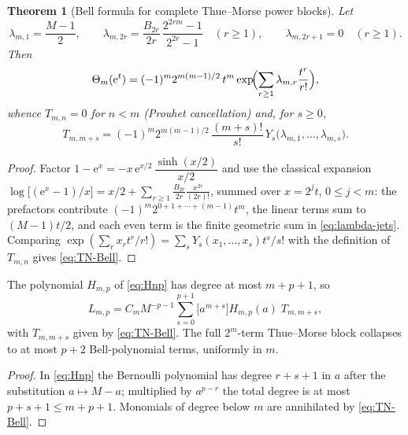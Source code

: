 \documentclass[11pt,oneside]{article}
\numberwithin{equation}{section}
\newtheorem{theorem}{Theorem}[section]
\theoremstyle{definition}
\theoremstyle{remark}
\newcommand{\e}{\mathrm e}
\newcommand{\Bell}{Y}
\newcommand{\ThetaTM}{\Theta}
\begin{document}
\begin{theorem}[Bell formula for complete Thue--Morse power blocks]
\label{thm:Bell-Prouhet}
Let
\begin{equation}
 \lambda_{m,1}=\frac{M-1}{2},
 \qquad
 \lambda_{m,2r}=\frac{B_{2r}}{2r}\,
 \frac{2^{2rm}-1}{2^{2r}-1}
 \quad(r\ge1),
 \qquad
 \lambda_{m,2r+1}=0\quad(r\ge1).
 \label{eq:lambda-jets}
\end{equation}
Then
\begin{equation}
 \ThetaTM_m(\e^{t})
 =(-1)^{m}2^{m(m-1)/2}\,t^{m}
 \exp\!\Bigl(\sum_{r\ge1}\lambda_{m,r}\frac{t^{r}}{r!}\Bigr),
 \label{eq:theta-Bell-egf}
\end{equation}
whence $T_{m,n}=0$ for $n<m$ (Prouhet cancellation) and, for
$s\ge0$,
\begin{equation}
 \boxed{\;
 T_{m,m+s}=(-1)^{m}2^{m(m-1)/2}\,
 \frac{(m+s)!}{s!}\,
 \Bell_s\bigl(\lambda_{m,1},\dots,\lambda_{m,s}\bigr).
 \;}
 \label{eq:TN-Bell}
\end{equation}
\end{theorem}

\begin{proof}
Factor $1-\e^{x}=-x\,\e^{x/2}\,\dfrac{\sinh(x/2)}{x/2}$ and use the
classical expansion
$\log\bigl[(\e^{x}-1)/x\bigr]
=x/2+\sum_{r\ge1}\frac{B_{2r}}{2r}\frac{x^{2r}}{(2r)!}$,
summed over $x=2^{j}t$, $0\le j<m$: the prefactors contribute
$(-1)^{m}2^{0+1+\cdots+(m-1)}t^{m}$, the linear terms sum to
$(M-1)t/2$, and each even term is the finite geometric sum in
\eqref{eq:lambda-jets}.  Comparing
$\exp(\sum_r x_rt^r/r!)=\sum_s\Bell_s(x_1,\dots,x_s)t^{s}/s!$ with the
definition of $T_{m,n}$ gives \eqref{eq:TN-Bell}.
\end{proof}

\begin{corollary}
\label{cor:pplus2}
The polynomial $H_{m,p}$ of \eqref{eq:Hnp} has degree at most
$m+p+1$, so
\begin{equation}
 \boxed{\;
 L_{m,p}=C_mM^{-p-1}
 \sum_{s=0}^{p+1}\bigl[a^{m+s}\bigr]H_{m,p}(a)\;T_{m,m+s},
 \;}
 \label{eq:Bell-collapse}
\end{equation}
with $T_{m,m+s}$ given by \eqref{eq:TN-Bell}.  The full
$2^{m}$-term Thue--Morse block collapses to at most $p+2$
Bell-polynomial terms, uniformly in $m$.
\end{corollary}

\begin{proof}
In \eqref{eq:Hnp} the Bernoulli polynomial has degree $r+s+1$ in $a$
after the substitution $a\mapsto M-a$; multiplied by $a^{p-r}$ the
total degree is at most $p+s+1\le m+p+1$.  Monomials of degree below
$m$ are annihilated by \eqref{eq:TN-Bell}.
\end{proof}
\end{document}
